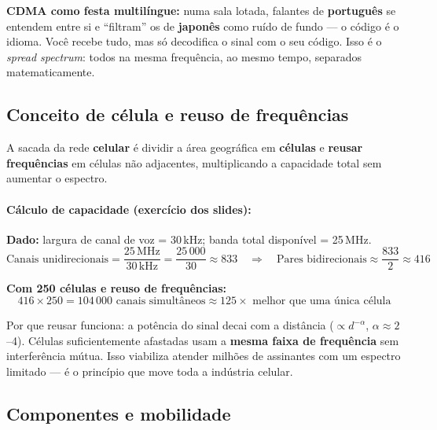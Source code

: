 \documentclass[11pt,a4paper]{article}
\begin{document}
\begin{analogia}
\textbf{CDMA como festa multilíngue:} numa sala lotada, falantes de \textbf{português} se entendem entre si e ``filtram'' os de \textbf{japonês} como ruído de fundo --- o código é o idioma. Você recebe tudo, mas só decodifica o sinal com o seu código. Isso é o \textit{spread spectrum}: todos na mesma frequência, ao mesmo tempo, separados matematicamente.
\end{analogia}

\subsection{Conceito de célula e reuso de frequências}

A sacada da rede \textbf{celular} é dividir a área geográfica em \textbf{células} e \textbf{reusar frequências} em células não adjacentes, multiplicando a capacidade total sem aumentar o espectro.

\paragraph{Cálculo de capacidade (exercício dos slides):}

\textbf{Dado:} largura de canal de voz = 30\,kHz; banda total disponível = 25\,MHz.
\[
\text{Canais unidirecionais} = \frac{25\,\text{MHz}}{30\,\text{kHz}} = \frac{25\,000}{30} \approx 833
\quad\Rightarrow\quad
\text{Pares bidirecionais} \approx \frac{833}{2} \approx 416
\]

\textbf{Com 250 células e reuso de frequências:}
\[
416 \times 250 = 104\,000 \text{ canais simultâneos} \approx 125\times\text{ melhor que uma única célula}
\]

\begin{reflexao}
Por que reusar funciona: a potência do sinal decai com a distância ($\propto d^{-\alpha}$, $\alpha \approx 2$--4). Células suficientemente afastadas usam a \textbf{mesma faixa de frequência} sem interferência mútua. Isso viabiliza atender milhões de assinantes com um espectro limitado --- é o princípio que move toda a indústria celular.
\end{reflexao}

\subsection{Componentes e mobilidade}
\end{document}
